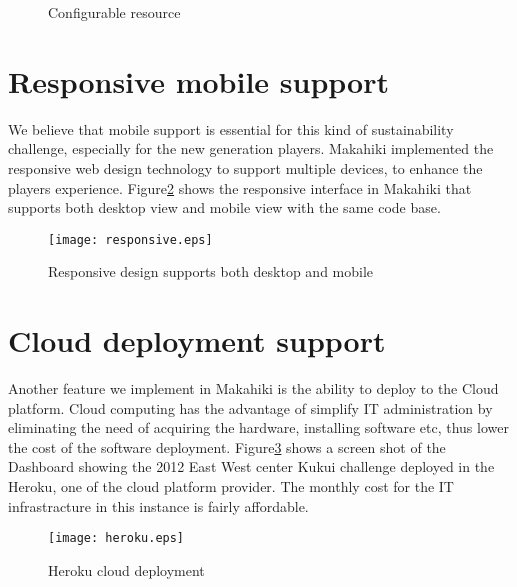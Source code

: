 \begin{figure}[htbp]
	\centering
		\caption{Configurable resource}
		\label{fig:resource}
\end{figure}

\section{Responsive mobile support}
We believe that mobile support is essential for this kind of sustainability challenge, especially for the new generation players. Makahiki implemented the responsive web design technology to support multiple devices, to enhance the players experience. Figure\ref{fig:responsive} shows the responsive interface in Makahiki that supports both desktop view and mobile view with the same code base.

\begin{figure}[t!]
  \center
  \texttt{[image: responsive.eps]}
  \caption{Responsive design supports both desktop and mobile}
  \label{fig:responsive}
\end{figure}

\section{Cloud deployment support}
Another feature we implement in Makahiki is the ability to deploy to the Cloud platform. Cloud computing has the advantage of simplify IT administration by eliminating the need of acquiring the hardware, installing software etc, thus lower the cost of the software deployment. Figure\ref{fig:heroku} shows a screen shot of the Dashboard showing the 2012 East West center Kukui challenge deployed in the Heroku, one of the cloud platform provider. The monthly cost for the IT infrastracture in this instance is fairly affordable. 

\begin{figure}[t!]
  \center
  \texttt{[image: heroku.eps]}
  \caption{Heroku cloud deployment}
  \label{fig:heroku}
\end{figure}

